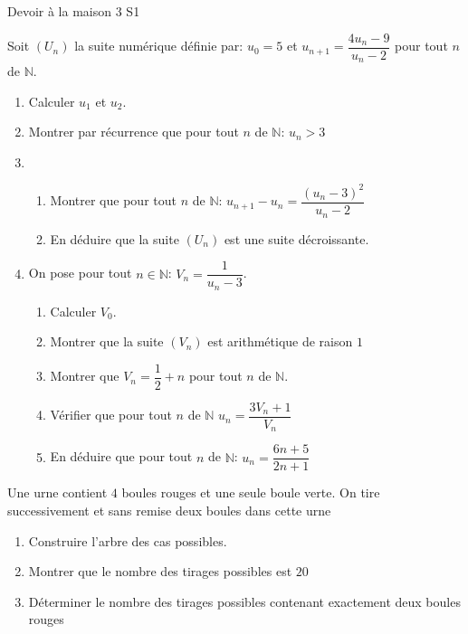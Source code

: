 \documentclass[12pt,a4paper,dvipsnames,svgnames,x11names,table]{article}
\begin{document}
 \begin{myboxe1}{Devoir à la maison 3 S1 }
\emph{\textbf{}} \hfill \emph{\textbf{}}         
\end{myboxe1}
\begin{myboxe11}{}
       \bccrayon Soit $\left( U_n \right)$ la suite numérique définie par: $u_0=5$ et $u_{n+1}=\dfrac{4u_n-9}{u_n-2}$ pour tout $n$ de $\mathbb{N}$.
\begin{enumerate}
\item Calculer $u_1$ et $u_2$. 
\item Montrer par récurrence que pour tout $n$ de $\mathbb{N}$: $u_n>3$
\item \begin{enumerate}
\item Montrer que pour tout $n$ de $\mathbb{N}$: $ u_{n+1}-u_n=\dfrac{\left(u_n-3 \right)^2}{u_n-2}$ 
\item En déduire que la suite $\left( U_n \right)$ est une suite décroissante. 
\end{enumerate}
\item On pose pour tout $n\in \mathbb{N}$: $V_n=\dfrac{1}{u_n-3}$.
\begin{enumerate}
\item Calculer $V_0$.
\item Montrer que la suite $\left( V_n \right)$ est arithmétique de raison $1$ 
\item Montrer que $V_n=\dfrac{1}{2}+n$ pour tout $n$ de $\mathbb{N}$.
\item Vérifier que pour tout $n$ de $\mathbb{N}$ $u_n=\dfrac{3V_n+1}{V_n}$
\item En déduire que pour tout $n$ de $\mathbb{N}$: $u_n=\dfrac{6n+5}{2n+1}$
\end{enumerate}
\end{enumerate}
\end{myboxe11}
\begin{myboxe11}{}
\bccrayon Une urne contient $4$ boules rouges et une seule boule verte. On tire successivement et sans remise deux boules dans cette urne
\begin{enumerate}
\item Construire l'arbre des cas possibles.
\item Montrer que le nombre des tirages possibles est $20$
\item Déterminer le nombre des tirages possibles contenant exactement deux boules rouges
\end{enumerate}
\end{myboxe11} 
\end{document}
